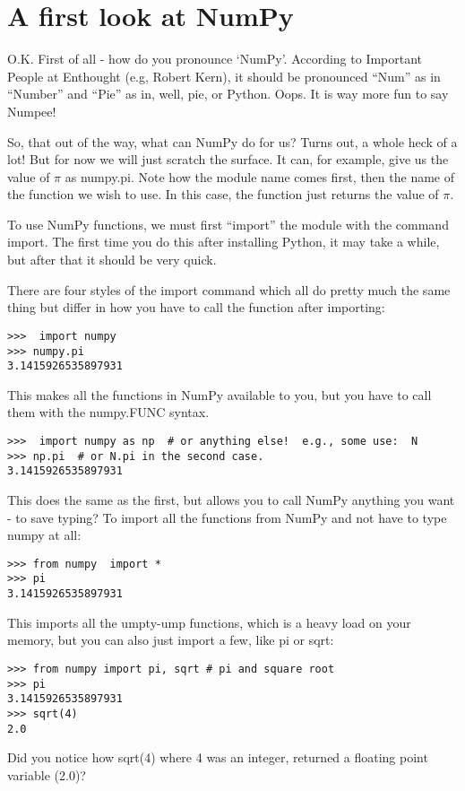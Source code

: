 \section{A first look at NumPy}

O.K.  First of all - how do you pronounce `NumPy'.  According to Important People at Enthought (e.g, Robert Kern), it should be pronounced ``Num'' as in ``Number'' and ``Pie'' as in, well, pie, or Python.  Oops.  It is way more fun to say Numpee!

So, that out of the way, what can NumPy do for us?  Turns out, a whole heck of a lot!  But for now we will just scratch the surface.   It can, for example, give us the value of $\pi$ as {\color{blue}numpy.pi}.  Note how the module name comes first, then the name of the function we wish to use.  In this case, the function just returns the value of $\pi$.  

To use {\color{blue}NumPy} functions, we must first ``import'' the module with the command {\color{blue}import}.  The first time you do this after installing Python, it may take a while, but after that it should be very quick.  

There are four styles of the import command which all do pretty much the same thing but differ in how you have to call the function after importing: 

{\singlespacing \color{blue} \begin{verbatim}
>>>  import numpy
>>> numpy.pi
3.1415926535897931
\end{verbatim}}
\noindent
This makes all the functions in NumPy available to you, but you have to call them with the {\color{blue}numpy.FUNC} syntax.

{\singlespacing \color{blue} \begin{verbatim}
>>>  import numpy as np  # or anything else!  e.g., some use:  N
>>> np.pi  # or N.pi in the second case.
3.1415926535897931
\end{verbatim}}
\noindent
This does the same as the first, but allows you to call NumPy anything you want - to save typing?
\noindent
To import all the functions from NumPy and not have to type numpy at all: 
{\singlespacing \color{blue} \begin{verbatim}
>>> from numpy  import *
>>> pi
3.1415926535897931
\end{verbatim}}
\noindent
This imports all the umpty-ump functions, which is a heavy load on your memory,  but you can also just import a few, like {\color{blue}pi} or {\color{blue}sqrt}:
{\singlespacing \color{blue} \begin{verbatim}
>>> from numpy import pi, sqrt # pi and square root
>>> pi
3.1415926535897931
>>> sqrt(4)
2.0
\end{verbatim}
}
\noindent
Did you notice how {\color{blue}sqrt(4)} where 4 was an integer, returned a floating point variable (2.0)?  

